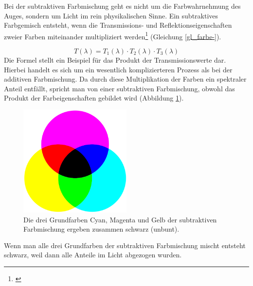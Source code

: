 
Bei der subtraktiven Farbmischung geht es nicht um die Farbwahrnehmung des Auges, sondern um Licht im rein physikalischen Sinne. Ein subtraktives Farbgemisch entsteht, wenn die Transmissions- und Reflektionseigenschaften zweier Farben miteinander multipliziert werden\footnote{\cite[84]{greule}} (Gleichung \ref{gl_farbe-}).

\begin{equation}\label{gl_farbe-}
		T(\lambda) = T_{1}(\lambda) \cdot T_{2}(\lambda) \cdot T_{3}(\lambda)
	\end{equation}
Die Formel stellt ein Beispiel für das Produkt der Transmissionswerte dar.
Hierbei handelt es sich um ein wesentlich komplizierteren Prozess als bei der additiven Farbmischung. Da durch diese Multiplikation der Farben ein spektraler Anteil entfällt, spricht man von einer subtraktiven Farbmischung, obwohl das Produkt der Farbeigenschaften gebildet wird (Abbildung \ref{b_farben-}).

\begin{figure}[H]     %
\centering
\includegraphics[width=0.5\textwidth]{bilder/farben-} 
\caption {Die drei Grundfarben Cyan, Magenta und Gelb der subtraktiven Farbmischung ergeben zusammen schwarz (unbunt).\protect\footnotemark}\label{b_farben-}
\end{figure}


Wenn man alle drei Grundfarben der subtraktiven Farbmischung mischt entsteht schwarz, weil dann alle Anteile im Licht abgezogen wurden.


